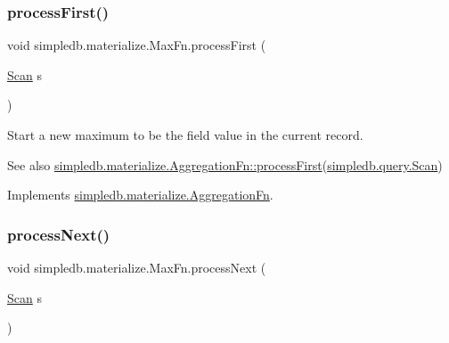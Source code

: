 \mbox{\label{classsimpledb_1_1materialize_1_1MaxFn_aeb7c0c3b7beddb944fac6f843f288cae}} 
\subsubsection{\texorpdfstring{process\+First()}{processFirst()}}
{\footnotesize\ttfamily void simpledb.\+materialize.\+Max\+Fn.\+process\+First (\begin{DoxyParamCaption}\item[{\hyperlink{interfacesimpledb_1_1query_1_1Scan}{Scan}}]{s }\end{DoxyParamCaption})\hspace{0.3cm}{\ttfamily [inline]}}

Start a new maximum to be the field value in the current record. \begin{DoxySeeAlso}{See also}
\hyperlink{interfacesimpledb_1_1materialize_1_1AggregationFn_abc424e0873445d14786ae0f3c539c80f}{simpledb.\+materialize.\+Aggregation\+Fn\+::process\+First}(\hyperlink{interfacesimpledb_1_1query_1_1Scan}{simpledb.\+query.\+Scan}) 
\end{DoxySeeAlso}


Implements \hyperlink{interfacesimpledb_1_1materialize_1_1AggregationFn_abc424e0873445d14786ae0f3c539c80f}{simpledb.\+materialize.\+Aggregation\+Fn}.

\mbox{\label{classsimpledb_1_1materialize_1_1MaxFn_a4ce58a04c1c3891b611771630a33dc74}} 
\subsubsection{\texorpdfstring{process\+Next()}{processNext()}}
{\footnotesize\ttfamily void simpledb.\+materialize.\+Max\+Fn.\+process\+Next (\begin{DoxyParamCaption}\item[{\hyperlink{interfacesimpledb_1_1query_1_1Scan}{Scan}}]{s }\end{DoxyParamCaption})\hspace{0.3cm}{\ttfamily [inline]}}

